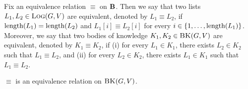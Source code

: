 Fix an equivalence relation $\equiv$ on $\text{\bf B}$. Then we say that two lists $L_1, L_2 \in \text{\sc Log}(G,V)$ are equivalent, denoted by $L_1 \equiv L_2$, if $\text{\rm length}(L_1) = \text{\rm length}(L_2)$ and $L_1[i] \equiv L_2[i]$ for every $i \in \{1, \ldots, \text{\rm length}(L_1)\}$. Moreover, we say that two bodies of knowledge $K_1, K_2 \in \text{\sc BK}(G,V)$ are equivalent, denoted by $K_1 \equiv K_2$, if (i) for every $L_1 \in K_1$, there exists $L_2 \in K_2$ such that $L_1 \equiv L_2$, and (ii) for every $L_2 \in K_2$, there exists $L_1 \in K_1$ such that $L_1 \equiv L_2$. 

\begin{mylem}
$\equiv$ is an equivalence relation on $\text{\sc BK}(G,V)$.
\end{mylem}

%
%



